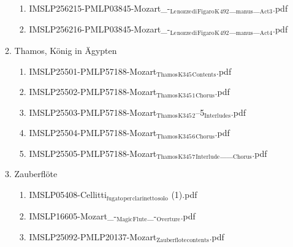 \documentclass[11pt]{article}
\begin{document}
\begin{enumerate}
\begin{enumerate}
\begin{enumerate}
\item IMSLP256215-PMLP03845-Mozart\_-$_{\text{Le}}$$_{\text{nozze}}$$_{\text{di}}$$_{\text{Figaro}}$$_{\text{K}}$$_{\text{492}}$\_$_{\text{manus}}$\_$_{\text{Act3}}$.pdf
\label{sec-1-1-1-1-44-49-3-9-14}

\item IMSLP256216-PMLP03845-Mozart\_-$_{\text{Le}}$$_{\text{nozze}}$$_{\text{di}}$$_{\text{Figaro}}$$_{\text{K}}$$_{\text{492}}$\_$_{\text{manus}}$\_$_{\text{Act4}}$.pdf
\label{sec-1-1-1-1-44-49-3-9-15}
\end{enumerate}

\item Thamos, König in Ägypten
\label{sec-1-1-1-1-44-49-3-10}
\begin{enumerate}
\item IMSLP25501-PMLP57188-Mozart$_{\text{Thamos}}$$_{\text{K345}}$$_{\text{Contents}}$.pdf
\label{sec-1-1-1-1-44-49-3-10-1}

\item IMSLP25502-PMLP57188-Mozart$_{\text{Thamos}}$$_{\text{K345}}$$_{\text{1}}$$_{\text{Chorus}}$.pdf
\label{sec-1-1-1-1-44-49-3-10-2}

\item IMSLP25503-PMLP57188-Mozart$_{\text{Thamos}}$$_{\text{K345}}$$_{\text{2}}$--5$_{\text{Interludes}}$.pdf
\label{sec-1-1-1-1-44-49-3-10-3}

\item IMSLP25504-PMLP57188-Mozart$_{\text{Thamos}}$$_{\text{K345}}$$_{\text{6}}$$_{\text{Chorus}}$.pdf
\label{sec-1-1-1-1-44-49-3-10-4}

\item IMSLP25505-PMLP57188-Mozart$_{\text{Thamos}}$$_{\text{K345}}$$_{\text{7}}$$_{\text{Interlude}}$\_\_$_{\text{Chorus}}$.pdf
\label{sec-1-1-1-1-44-49-3-10-5}
\end{enumerate}

\item Zauberflöte
\label{sec-1-1-1-1-44-49-3-11}
\begin{enumerate}
\item IMSLP05408-Cellitti$_{\text{fugato}}$$_{\text{per}}$$_{\text{clarinetto}}$$_{\text{solo}}$ (1).pdf
\label{sec-1-1-1-1-44-49-3-11-1}

\item IMSLP16605-Mozart\_-$_{\text{Magic}}$$_{\text{Flute}}$\_-$_{\text{Overture}}$.pdf
\label{sec-1-1-1-1-44-49-3-11-2}

\item IMSLP25092-PMLP20137-Mozart$_{\text{Zauberflote}}$$_{\text{contents}}$.pdf
\label{sec-1-1-1-1-44-49-3-11-3}


\end{enumerate}
\end{enumerate}
\end{enumerate}
\end{document}
